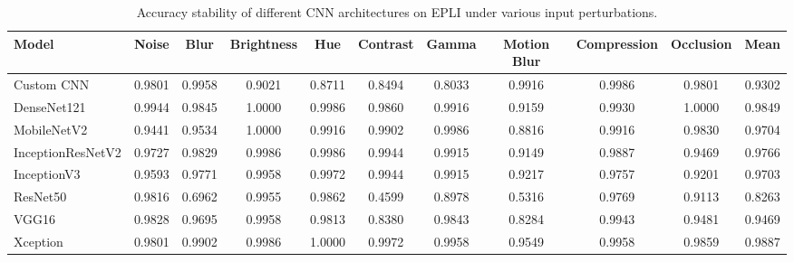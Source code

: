 \documentclass[a4paper,fleqn]{cas-dc}
\begin{document}
\begin{table}[t]
\centering
\caption{Accuracy stability of different CNN architectures on EPLI under various input perturbations.}
\label{tab:accuracy_stability_egypli}

\scriptsize
\setlength{\tabcolsep}{3pt}
\renewcommand{\arraystretch}{1.1}

\begin{tabular}{|l|ccccccccc|c|}
\hline
\textbf{Model} &
\textbf{Noise} &
\textbf{Blur} &
\textbf{Brightness} &
\textbf{Hue} &
\textbf{Contrast} &
\textbf{Gamma} &
\textbf{Motion Blur} &
\textbf{Compression} &
\textbf{Occlusion} &
\textbf{Mean}\\
\hline

Custom CNN
&0.9801&0.9958&0.9021&0.8711&0.8494&0.8033&0.9916&0.9986&0.9801&0.9302\\

DenseNet121
&0.9944&0.9845&1.0000&0.9986&0.9860&0.9916&0.9159&0.9930&1.0000&0.9849\\

MobileNetV2
&0.9441&0.9534&1.0000&0.9916&0.9902&0.9986&0.8816&0.9916&0.9830&0.9704\\

InceptionResNetV2
&0.9727&0.9829&0.9986&0.9986&0.9944&0.9915&0.9149&0.9887&0.9469&0.9766\\

InceptionV3
&0.9593&0.9771&0.9958&0.9972&0.9944&0.9915&0.9217&0.9757&0.9201&0.9703\\

ResNet50
&0.9816&0.6962&0.9955&0.9862&0.4599&0.8978&0.5316&0.9769&0.9113&0.8263\\

VGG16
&0.9828&0.9695&0.9958&0.9813&0.8380&0.9843&0.8284&0.9943&0.9481&0.9469\\

Xception
&0.9801&0.9902&0.9986&1.0000&0.9972&0.9958&0.9549&0.9958&0.9859&0.9887\\

\hline
\end{tabular}
\end{table}
\end{document}
